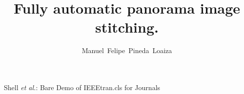 \documentclass[journal]{IEEEtran}
\begin{document}
%
\title{Fully automatic panorama image stitching.}
%
%
%

\author{Manuel~Felipe~Pineda~Loaiza%
}

%
%



%
{Shell \MakeLowercase{\textit{et al.}}: Bare Demo of IEEEtran.cls for Journals}


\maketitle
\end{document}
